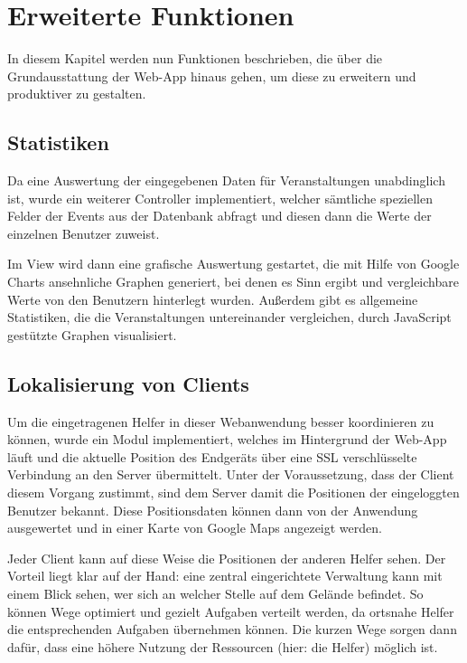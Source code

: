\chapter{Erweiterte Funktionen}
In diesem Kapitel werden nun Funktionen beschrieben, die über die Grundausstattung der Web-App hinaus gehen, um diese zu erweitern und produktiver zu gestalten. 

\section{Statistiken}
Da eine Auswertung der eingegebenen Daten für Veranstaltungen unabdinglich ist, wurde ein weiterer Controller implementiert, welcher sämtliche speziellen Felder der Events aus der Datenbank abfragt und diesen dann die Werte der einzelnen Benutzer zuweist.\par

Im View wird dann eine grafische Auswertung gestartet, die mit Hilfe von Google Charts ansehnliche Graphen generiert, bei denen es Sinn ergibt und vergleichbare Werte von den Benutzern hinterlegt wurden. Außerdem gibt es allgemeine Statistiken, die die Veranstaltungen untereinander vergleichen, durch JavaScript gestützte Graphen visualisiert.

\section{Lokalisierung von Clients}
Um die eingetragenen Helfer in dieser Webanwendung besser koordinieren zu können, wurde ein Modul implementiert, welches im Hintergrund der Web-App läuft und die aktuelle Position des Endgeräts über eine SSL verschlüsselte Verbindung an den Server übermittelt. Unter der Voraussetzung, dass der Client diesem Vorgang zustimmt, sind dem Server damit die Positionen der eingeloggten Benutzer bekannt. Diese Positionsdaten können dann von der Anwendung ausgewertet und in einer Karte von Google Maps angezeigt werden.\par

Jeder Client kann auf diese Weise die Positionen der anderen Helfer sehen. Der Vorteil liegt klar auf der Hand: eine zentral eingerichtete Verwaltung kann mit einem Blick sehen, wer sich an welcher Stelle auf dem Gelände befindet. So können Wege optimiert und gezielt Aufgaben verteilt werden, da ortsnahe Helfer die entsprechenden Aufgaben übernehmen können. Die kurzen Wege sorgen dann dafür, dass eine höhere Nutzung der Ressourcen (hier: die Helfer) möglich ist.\par

